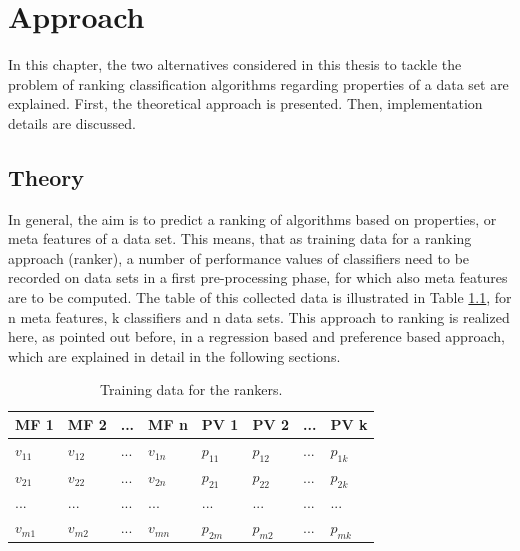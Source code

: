%
\chapter{Approach}
\label{sec:approach}

In this chapter, the two alternatives considered in this thesis to tackle the problem of ranking classification algorithms regarding properties of a data set are explained. First, the theoretical approach is presented. Then, implementation details are discussed.

\section{Theory}

In general, the aim is to predict a ranking of algorithms based on properties, or meta features of a data set. This means, that as training data for a ranking approach (ranker), a number of performance values of classifiers need to be recorded on data sets in a first pre-processing phase, for which also meta features are to be computed. The table of this collected data is illustrated in Table \ref{tab:performanceValues}, for n meta features, k classifiers and n data sets. This approach to ranking is realized here, as pointed out before, in a regression based and preference based approach, which are explained in detail in the following sections.

\begin{table}[h]
\centering
	\begin{tabularx}{\textwidth}{X | X | X | X | X | X | X | X}
		MF 1			& MF 2		& ... 	& MF n		& PV 1 		& PV 2 		&	...	&	PV k 		\\ \hline
		$v_{11}$		& $v_{12}$	& ...	& $v_{1n}$	& $p_{11}$	& $p_{12}$	& 	...	&	$p_{1k}$		\\ 
		$v_{21}$		& $v_{22}$	& ...	& $v_{2n}$	& $p_{21}$	& $p_{22}$	& 	...	&	$p_{2k}$		\\ 
		...			& ...		& ...	& ...		& ...		& ...		&	...	&	...			\\ 
		$v_{m1}$		& $v_{m2}$	& ... 	& $v_{mn}$	& $p_{2m}$	& $p_{m2}$	& 	...	&	$p_{mk}$			 
	\end{tabularx}
	\caption{Training data for the rankers.}
	\label{tab:performanceValues}
\end{table}

